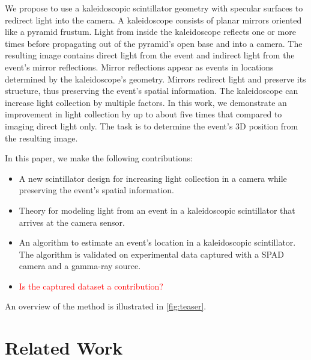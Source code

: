We propose to use a kaleidoscopic scintillator geometry with specular surfaces to 
redirect light into the camera.
A kaleidoscope consists of planar mirrors oriented like a pyramid frustum.
Light from inside the kaleidoscope reflects one or more times before 
propagating out of the pyramid's open base and into a camera.
The resulting image contains direct light from the event and indirect light from 
the event's mirror reflections. 
Mirror reflections appear as events in locations determined by the kaleidoscope's geometry.
Mirrors redirect light and preserve its structure, thus preserving the event's 
spatial information.
The kaleidoscope can increase light collection by multiple factors.
In this work, we demonstrate an improvement in light collection by up to about 
five times that compared to imaging direct light only.
The task is to determine the event's 3D position from the resulting image.



In this paper, we make the following contributions: 
\begin{itemize}
\item A new scintillator design for increasing light collection in a camera while 
preserving the event's spatial information.
\item Theory for modeling light from an event in a kaleidoscopic scintillator that 
arrives at the camera sensor.
\item An algorithm to estimate an event's location in a kaleidoscopic scintillator. 
The algorithm is validated on experimental data captured with a SPAD camera and a 
gamma-ray source.
\item \textcolor{red}{Is the captured dataset a contribution?}
\end{itemize}
An overview of the method is illustrated in \cref{fig:teaser}.


\section{Related Work}

